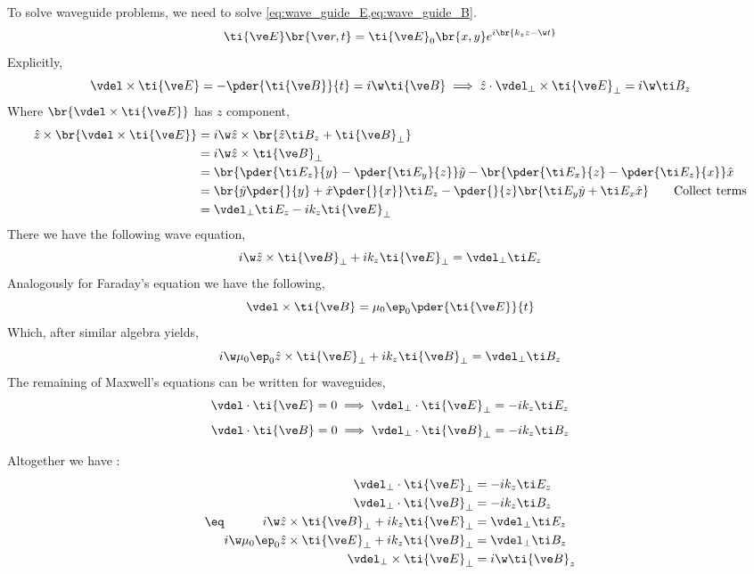 \documentclass{article}
\begin{document}
To solve waveguide problems, we need to solve \cref{eq:wave_guide_E,eq:wave_guide_B}.
\[ \ti {\ve E}\br{\ve r, t} = \ti {\ve E}_0\br{x,y} e^{i\br{k_z z - \w t}}\]
Explicitly,
\[ \vdel \times \ti {\ve E} = - \pder{\ti {\ve B}}{t} = i \w \ti {\ve B} \implies \hat z \cdot \vdel_{\perp} \times \ti {\ve E}_{\perp} = i \w \ti B_z \]
Where $\br{\vdel \times \ti {\ve E}}$ has $z$ component,
\begin{align*}
\hat z \times \br{\vdel \times \ti {\ve E}}
&= i \w \hat z \times \br{\hat z \ti B_z + \ti{\ve B}_{\perp}}\\
&= i \w \hat z \times \ti{\ve B}_{\perp}\\
&= \br{\pder{\ti E_z}{y} - \pder{\ti E_y}{z}} \hat y - \br{\pder{\ti E_x}{z} - \pder{\ti E_z}{x}} \hat x \\
&= \br{\hat y \pder{}{y} + \hat x \pder{}{x}} \ti E_z - \pder{}{z}\br{\ti E_y \hat y + \ti E_x \hat x} \qquad \text{Collect terms}\\
&= \vdel_{\perp} \ti E_z - i k_z \ti {\ve E}_{\perp}
\end{align*}
There we have the following wave equation,
\[ i \w \hat z \times \ti{\ve B}_{\perp} + i k_z \ti {\ve E}_{\perp} = \vdel_{\perp} \ti E_z \]
Analogously for Faraday's equation we have the following,
\[ \vdel \times \ti {\ve B} = \mu_0 \ep_0 \pder{\ti {\ve E}}{t} \]
Which, after similar algebra yields,
\[ i \w \mu_0 \ep_0 \hat z \times \ti{\ve E}_{\perp} + i k_z \ti {\ve B}_{\perp} = \vdel_{\perp} \ti B_z \]
The remaining of Maxwell's equations can be written for waveguides,
\[ \vdel \cdot \ti {\ve E} = 0 \implies \vdel_{\perp} \cdot \ti{\ve E}_{\perp} = -i k_z \ti E_z \]
\[ \vdel \cdot \ti {\ve B} = 0 \implies \vdel_{\perp} \cdot \ti{\ve B}_{\perp} = -i k_z \ti B_z \]

Altogether we have :
\begin{align*}
    \eq \label{eq:wave_guide_me}
    \begin{split}
    \vdel_{\perp} \cdot \ti{\ve E}_{\perp} &= -i k_z \ti E_z \\
    \vdel_{\perp} \cdot \ti{\ve B}_{\perp} &= -i k_z \ti B_z \\
    i \w \hat z \times \ti{\ve B}_{\perp} + i k_z \ti {\ve E}_{\perp} &= \vdel_{\perp} \ti E_z \\
    i \w \mu_0 \ep_0 \hat z \times \ti{\ve E}_{\perp} + i k_z \ti {\ve B}_{\perp} &= \vdel_{\perp} \ti B_z \\
    \vdel_{\perp} \times \ti {\ve E}_{\perp} &= i \w \ti {\ve B}_z
    \end{split}
\end{align*}
\end{document}
